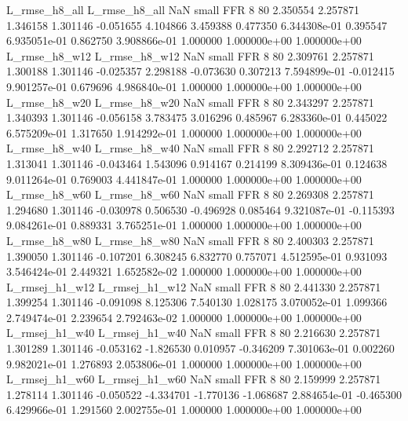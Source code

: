  L_rmse_h8_all  L_rmse_h8_all                   NaN      small      FFR                 8 80 2.350554       2.257871 1.346158       1.301146   -0.051655      4.104866      3.459388     0.477350   6.344308e-01  0.395547 6.935051e-01     0.862750   3.908866e-01            1.000000    1.000000e+00        1.000000e+00
 L_rmse_h8_w12  L_rmse_h8_w12                   NaN      small      FFR                 8 80 2.309761       2.257871 1.300188       1.301146   -0.025357      2.298188     -0.073630     0.307213   7.594899e-01 -0.012415 9.901257e-01     0.679696   4.986840e-01            1.000000    1.000000e+00        1.000000e+00
 L_rmse_h8_w20  L_rmse_h8_w20                   NaN      small      FFR                 8 80 2.343297       2.257871 1.340393       1.301146   -0.056158      3.783475      3.016296     0.485967   6.283360e-01  0.445022 6.575209e-01     1.317650   1.914292e-01            1.000000    1.000000e+00        1.000000e+00
 L_rmse_h8_w40  L_rmse_h8_w40                   NaN      small      FFR                 8 80 2.292712       2.257871 1.313041       1.301146   -0.043464      1.543096      0.914167     0.214199   8.309436e-01  0.124638 9.011264e-01     0.769003   4.441847e-01            1.000000    1.000000e+00        1.000000e+00
 L_rmse_h8_w60  L_rmse_h8_w60                   NaN      small      FFR                 8 80 2.269308       2.257871 1.294680       1.301146   -0.030978      0.506530     -0.496928     0.085464   9.321087e-01 -0.115393 9.084261e-01     0.889331   3.765251e-01            1.000000    1.000000e+00        1.000000e+00
 L_rmse_h8_w80  L_rmse_h8_w80                   NaN      small      FFR                 8 80 2.400303       2.257871 1.390050       1.301146   -0.107201      6.308245      6.832770     0.757071   4.512595e-01  0.931093 3.546424e-01     2.449321   1.652582e-02            1.000000    1.000000e+00        1.000000e+00
L_rmsej_h1_w12 L_rmsej_h1_w12                   NaN      small      FFR                 8 80 2.441330       2.257871 1.399254       1.301146   -0.091098      8.125306      7.540130     1.028175   3.070052e-01  1.099366 2.749474e-01     2.239654   2.792463e-02            1.000000    1.000000e+00        1.000000e+00
L_rmsej_h1_w40 L_rmsej_h1_w40                   NaN      small      FFR                 8 80 2.216630       2.257871 1.301289       1.301146   -0.053162     -1.826530      0.010957    -0.346209   7.301063e-01  0.002260 9.982021e-01     1.276893   2.053806e-01            1.000000    1.000000e+00        1.000000e+00
L_rmsej_h1_w60 L_rmsej_h1_w60                   NaN      small      FFR                 8 80 2.159999       2.257871 1.278114       1.301146   -0.050522     -4.334701     -1.770136    -1.068687   2.884654e-01 -0.465300 6.429966e-01     1.291560   2.002755e-01            1.000000    1.000000e+00        1.000000e+00
